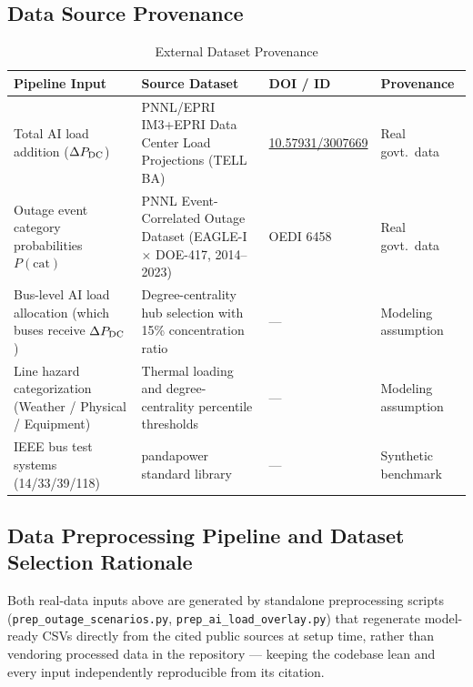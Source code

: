\documentclass[11pt]{article}
\begin{document}
\subsection{Data Source Provenance}
\begin{table}[h!]
\centering
\caption{External Dataset Provenance}
\label{tab:dataset-provenance}
\vspace{0.5em}
\begin{tabular}{p{3.5cm}p{4.0cm}p{2.7cm}p{3.0cm}}
\toprule
\textbf{Pipeline Input} & \textbf{Source Dataset} & \textbf{DOI / ID} & \textbf{Provenance} \\
\midrule
Total AI load addition ($\Delta P_{\rm DC}$) & PNNL/EPRI IM3+EPRI Data Center Load Projections (TELL BA) & \url{10.57931/3007669} & \cellcolor{green!15}Real govt.\ data \\
\addlinespace
Outage event category probabilities $P(\text{cat})$ & PNNL Event-Correlated Outage Dataset (EAGLE-I $\times$ DOE-417, 2014--2023) & OEDI 6458 & \cellcolor{green!15}Real govt.\ data \\
\addlinespace
Bus-level AI load allocation (which buses receive $\Delta P_{\rm DC}$) & Degree-centrality hub selection with 15\% concentration ratio & --- & \cellcolor{yellow!25}Modeling assumption \\
\addlinespace
Line hazard categorization (Weather / Physical / Equipment) & Thermal loading and degree-centrality percentile thresholds & --- & \cellcolor{yellow!25}Modeling assumption \\
\addlinespace
IEEE bus test systems (14/33/39/118) & pandapower standard library~\cite{pandapower2018} & --- & \cellcolor{blue!10}Synthetic benchmark \\
\bottomrule
\end{tabular}
\end{table}

\subsection{Data Preprocessing Pipeline and Dataset Selection Rationale}
Both real-data inputs above are generated by standalone preprocessing scripts (\texttt{prep\_outage\_scenarios.py}, \texttt{prep\_ai\_load\_overlay.py}) that regenerate model-ready CSVs directly from the cited public sources at setup time, rather than vendoring processed data in the repository --- keeping the codebase lean and every input independently reproducible from its citation.
\end{document}
